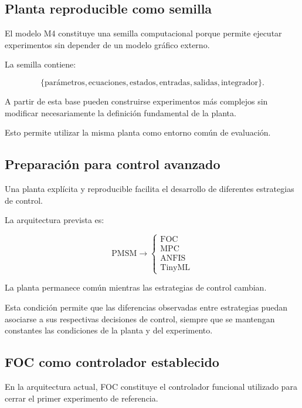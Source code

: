 \subsection{Planta reproducible como semilla}

El modelo M4 constituye una semilla computacional porque permite ejecutar experimentos sin depender de un modelo gráfico externo.

La semilla contiene:

\begin{equation}
\{
\text{parámetros},
\text{ecuaciones},
\text{estados},
\text{entradas},
\text{salidas},
\text{integrador}
\}.
\end{equation}

A partir de esta base pueden construirse experimentos más complejos sin modificar necesariamente la definición fundamental de la planta.

Esto permite utilizar la misma planta como entorno común de evaluación.

\subsection{Preparación para control avanzado}

Una planta explícita y reproducible facilita el desarrollo de diferentes estrategias de control.

La arquitectura prevista es:

\begin{equation}
\text{PMSM}
\rightarrow
\left\{
\begin{array}{c}
\mathrm{FOC}\\
\mathrm{MPC}\\
\mathrm{ANFIS}\\
\mathrm{TinyML}
\end{array}
\right.
\end{equation}

La planta permanece común mientras las estrategias de control cambian.

Esta condición permite que las diferencias observadas entre estrategias puedan asociarse a sus respectivas decisiones de control, siempre que se mantengan constantes las condiciones de la planta y del experimento.

\subsection{FOC como controlador establecido}

En la arquitectura actual, FOC constituye el controlador funcional utilizado para cerrar el primer experimento de referencia.

